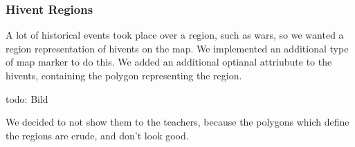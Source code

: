 \subsubsection{Hivent Regions}
A lot of historical events took place over a region, such as wars, so we wanted a region representation of hivents on the map.
We implemented an additional type of map marker to do this.
We added an additional optianal attriubute to the hivents, containing the polygon representing the region.

todo: Bild

We decided to not show them to the teachers, because the polygons which define the regions are crude, and don't look good.




